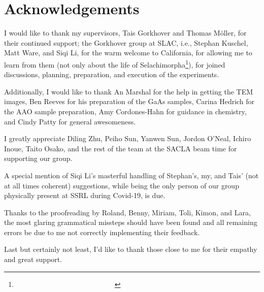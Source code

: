 \chapter*{Acknowledgements}
\onehalfspacing
I would like to thank my supervisors, Tais Gorkhover and Thomas Möller, for their continued support; the Gorkhover group at SLAC, i.e., Stephan Kuschel, Matt Ware, and Siqi Li, for the warm welcome to California, for allowing me to learn from them (not only about the life of Selachimorpha\footnote{\textcolor{white}{Baby shark, do do, do do do do}}), for joined discussions, planning, preparation, and execution of the experiments.

Additionally, I would like to thank An Marshal for the help in getting the TEM images, Ben Reeves for his preparation of the GaAs samples, Carina Hedrich for the AAO sample preparation, Amy Cordones-Hahn for guidance in chemistry, and Cindy Patty for general awesomeness.

I greatly appreciate Diling Zhu, Peiho Sun, Yanwen Sun, Jordon O'Neal, Ichiro Inoue, Taito Osako, and the rest of the team at the SACLA beam time for supporting our group. 

A special mention of Siqi Li's masterful handling of Stephan's, my, and Tais' (not at all times coherent) suggestions, while being the only person of our group physically present at SSRL during Covid-19, is due.

Thanks to the proofreading by Roland, Benny, Miriam, Toli, Kimon, and Lara, the most glaring grammatical missteps should have been found and all remaining errors be due to me not correctly implementing their feedback. 

Last but certainly not least, I'd like to thank those close to me for their empathy and great support.